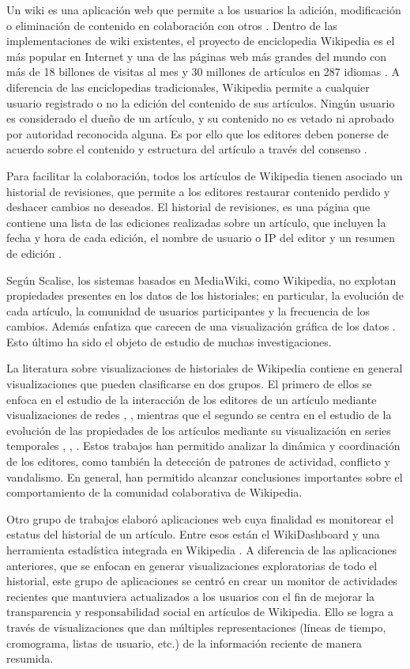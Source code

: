 Un wiki es una aplicación web que permite a los usuarios la adición, modificación o eliminación de contenido en colaboración con otros \cite{Wiki}. Dentro de las implementaciones de wiki existentes, el proyecto de enciclopedia Wikipedia es el más popular en Internet y una de las páginas web más grandes del mundo con más de 18 billones de visitas al mes y 30 millones de artículos en 287 idiomas \cite{Wikipedia}.
A diferencia de las enciclopedias tradicionales, Wikipedia permite a cualquier usuario registrado o no la edición del contenido de sus artículos. Ningún usuario es considerado el dueño de un artículo, y su contenido no es vetado ni aprobado por autoridad reconocida alguna. Es por ello que los editores deben ponerse de acuerdo sobre el contenido y estructura del artículo a través del consenso \cite{Wikipedia}.

Para facilitar la colaboración, todos los artículos de Wikipedia tienen asociado un historial de revisiones, que permite a los editores restaurar contenido perdido y deshacer cambios no deseados. El historial de revisiones, es una página que contiene una lista de las ediciones realizadas sobre un artículo, que incluyen la fecha y hora de cada edición, el nombre de usuario o IP del editor y un resumen de edición \cite{WikiHelp}.

Según Scalise, los sistemas basados en MediaWiki, como Wikipedia, no explotan propiedades presentes en los datos de los historiales; en particular, la evolución de cada artículo, la comunidad de usuarios participantes y la frecuencia de los cambios. Además enfatiza que carecen de una visualización gráfica de los datos \cite{Sca08}. Esto último ha sido el objeto de estudio de muchas investigaciones.

La literatura sobre visualizaciones de historiales de Wikipedia contiene en general visualizaciones que pueden clasificarse en dos grupos. El primero de ellos se enfoca en el estudio de la interacción de los editores de un artículo mediante visualizaciones de redes \cite{Suh07}, \cite{Kee12}, mientras que el segundo se centra en el estudio de la evolución de las propiedades de los artículos mediante su visualización en series temporales \cite{Vie04}, \cite{Wat07}, \cite{Nun08}. Estos trabajos han permitido analizar la dinámica y coordinación de los editores, como también la detección de patrones de actividad, conflicto y vandalismo. En general, han permitido alcanzar conclusiones importantes sobre el comportamiento de la comunidad colaborativa de Wikipedia.

Otro grupo de trabajos elaboró aplicaciones web cuya finalidad es monitorear el estatus del historial de un artículo. Entre esos están el WikiDashboard \cite{Suh08} y una herramienta estadística integrada en Wikipedia \cite{Aka}. A diferencia de las aplicaciones anteriores, que se enfocan en generar visualizaciones exploratorias de todo el historial, este grupo de aplicaciones se centró en crear un monitor de actividades recientes que mantuviera actualizados a los usuarios con el fin de mejorar la transparencia y responsabilidad social en artículos de Wikipedia. Ello se logra a través de visualizaciones que dan múltiples representaciones (líneas de tiempo, cromograma, listas de usuario, etc.) de la información reciente de manera resumida.

